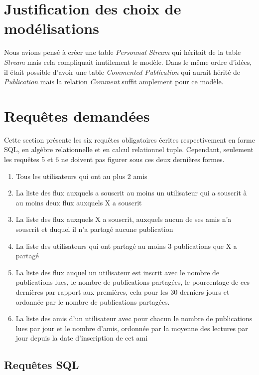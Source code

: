 \documentclass[a4paper,10pt]{article}
\begin{document}
\section{Justification des choix de modélisations}

Nous avions pensé à créer une table \textsl{Personnal Stream} qui héritait de la table \textsl{Stream} mais cela compliquait inutilement le modèle. Dans le même ordre d'idées, il était possible d'avoir une table \textsl{Commented Publication} qui aurait hérité de \textsl{Publication} mais la relation \textsl{Comment} suffit amplement pour ce modèle.

\section{Requêtes demandées}

Cette section présente les six requêtes obligatoires écrites respectivement en forme SQL, en algèbre relationnelle et en calcul relationnel tuple. Cependant, seulement les requêtes 5 et 6 ne doivent pas figurer sous ces deux dernières formes.

	\begin{enumerate}
	    \item Tous les utilisateurs qui ont au plus 2 amis
	    \item La liste des flux auxquels a souscrit au moins un utilisateur qui a souscrit à au moins deux flux auxquels X a souscrit
	    \item La liste des flux auxquels X a souscrit, auxquels aucun de ses amis n’a souscrit et duquel il n’a partagé aucune publication
	    \item La liste des utilisateurs qui ont partagé au moins 3 publications que X a partagé
	    \item La liste des flux auquel un utilisateur est inscrit avec le nombre de publications lues, le nombre de publications partagées, le pourcentage de ces dernières par rapport aux premières, cela pour les 30 derniers jours et ordonnée par le nombre de publications partagées.
	    \item La liste des amis d’un utilisateur avec pour chacun le nombre de publications lues par jour et le nombre d’amis, ordonnée par la moyenne des lectures par jour depuis la date d’inscription de cet ami
	\end{enumerate}
	
\subsection{Requêtes SQL}
\end{document}
